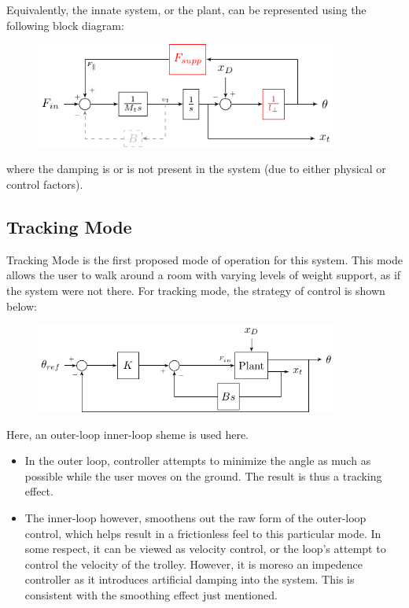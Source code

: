 \documentclass[letterpaper]{article}
\begin{document}
Equivalently, the innate system, or the plant, can be represented using the following block diagram:
\begin{figure}[H]
    \centering
    \includegraphics[width=10cm]{tracking_modified_plant_block.pdf}
\end{figure}

where the damping is or is not present in the system (due to either physical or control factors).

\subsection{Tracking Mode}
Tracking Mode is the first proposed mode of operation for this system. This mode allows the user to walk around a room with varying levels of weight support, as if the system were not there. For tracking mode, the strategy of control is shown below:
\begin{figure}[H]
    \centering
    \includegraphics[width=10cm]{tracking_controller.pdf}
\end{figure}

Here, an outer-loop inner-loop sheme is used here.
\begin{itemize}
    \item In the outer loop, controller attempts to minimize the angle as much as possible while the user moves on the ground. The result is thus a tracking effect. 
    \item The inner-loop however, smoothens out the raw form of the outer-loop control, which helps result in a frictionless feel to this particular mode. In some respect, it can be viewed as velocity control, or the loop's attempt to control the velocity of the trolley. However, it is moreso an impedence controller as it introduces artificial damping into the system. This is consistent with the smoothing effect just mentioned.
\end{itemize}
\end{document}
